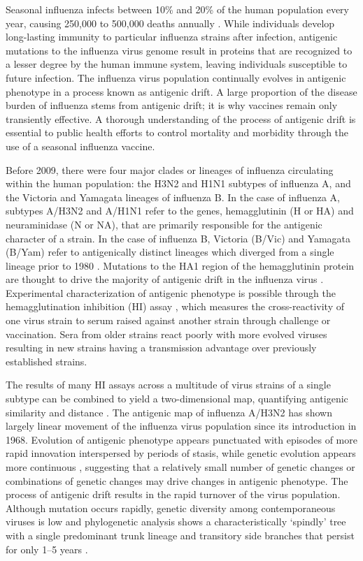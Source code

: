 \documentclass[11pt,oneside,letterpaper]{article}
\begin{document}
Seasonal influenza infects between 10\% and 20\% of the human population every year, causing 250,000 to 500,000 deaths annually \cite{flufactsheet}. 
While individuals develop long-lasting immunity to particular influenza strains after infection, antigenic mutations to the influenza virus genome result in proteins that are recognized to a lesser degree by the human immune system, leaving individuals susceptible to future infection. 
The influenza virus population continually evolves in antigenic phenotype in a process known as antigenic drift. 
A large proportion of the disease burden of influenza stems from antigenic drift; it is why vaccines remain only transiently effective. 
A thorough understanding of the process of antigenic drift is essential to public health efforts to control mortality and morbidity through the use of a seasonal influenza vaccine.

Before 2009, there were four major clades or lineages of influenza circulating within the human population: the H3N2 and H1N1 subtypes of influenza A, and the Victoria and Yamagata lineages of influenza B. 
In the case of influenza A, subtypes A/H3N2 and A/H1N1 refer to the genes, hemagglutinin (H or HA) and neuraminidase (N or NA), that are primarily responsible for the antigenic character of a strain. 
In the case of influenza B, Victoria (B/Vic) and Yamagata (B/Yam) refer to antigenically distinct lineages which diverged from a single lineage prior to 1980 \cite{Rota90}.
Mutations to the HA1 region of the hemagglutinin protein are thought to drive the majority of antigenic drift in the influenza virus \cite{Wiley81, Nelson07NatRevGenet}. 
Experimental characterization of antigenic phenotype is possible through the hemagglutination inhibition (HI) assay \cite{Hirst43}, which measures the cross-reactivity of one virus strain to serum raised against another strain through challenge or vaccination. 
Sera from older strains react poorly with more evolved viruses resulting in new strains having a transmission advantage over previously established strains.

The results of many HI assays across a multitude of virus strains of a single subtype can be combined to yield a two-dimensional map, quantifying antigenic similarity and distance \cite{Smith04}. 
The antigenic map of influenza A/H3N2 has shown largely linear movement of the influenza virus population since its introduction in 1968. 
Evolution of antigenic phenotype appears punctuated with episodes of more rapid innovation interspersed by periods of stasis, while genetic evolution appears more continuous \cite{Smith04}, suggesting that a relatively small number of genetic changes or combinations of genetic changes may drive changes in antigenic phenotype. 
The process of antigenic drift results in the rapid turnover of the virus population. 
Although mutation occurs rapidly, genetic diversity among contemporaneous viruses is low and phylogenetic analysis shows a characteristically `spindly' tree with a single predominant trunk lineage and transitory side branches that persist for only 1--5 years \cite{Fitch97}.
\end{document}

